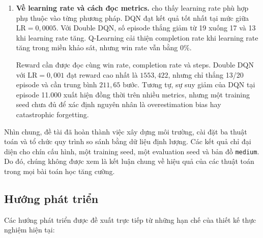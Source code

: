 \begin{enumerate}
    Trong thiết kế hiện tại, hai cấu hình sử dụng Q-network đạt kết quả cao hơn Q-Learning. Tuy nhiên, Q-Learning dùng tuple state 17 giá trị, còn DQN và Double DQN dùng vector 92 chiều. Vì vậy, chênh lệch quan sát được chịu ảnh hưởng đồng thời của thuật toán và cách biểu diễn state, không thể được quy hoàn toàn cho riêng thuật toán.

    \item \textbf{Về learning rate và cách đọc metrics.}  cho thấy learning rate phù hợp phụ thuộc vào từng phương pháp. DQN đạt kết quả tốt nhất tại mức giữa $\mathrm{LR}=0{,}0005$. Với Double DQN, số episode thắng giảm từ 19 xuống 17 và 13 khi learning rate tăng. Q-Learning cải thiện completion rate khi learning rate tăng trong miền khảo sát, nhưng win rate vẫn bằng $0\%$.

    Reward cần được đọc cùng win rate, completion rate và steps. Double DQN với $\mathrm{LR}=0{,}001$ đạt reward cao nhất là $1553{,}422$, nhưng chỉ thắng 13/20 episode và cần trung bình $211{,}65$ bước. Tương tự, sự suy giảm của DQN tại episode 11.000 xuất hiện đồng thời trên nhiều metrics, nhưng một training seed chưa đủ để xác định nguyên nhân là overestimation bias hay catastrophic forgetting.
\end{enumerate}

Nhìn chung, đề tài đã hoàn thành việc xây dựng môi trường, cài đặt ba thuật toán và tổ chức quy trình so sánh bằng dữ liệu định lượng. Các kết quả chỉ đại diện cho chín cấu hình, một training seed, một evaluation seed và bản đồ \texttt{medium}. Do đó, chúng không được xem là kết luận chung về hiệu quả của các thuật toán trong mọi bài toán học tăng cường.

\subsection{Hướng phát triển}

Các hướng phát triển được đề xuất trực tiếp từ những hạn chế của thiết kế thực nghiệm hiện tại:


